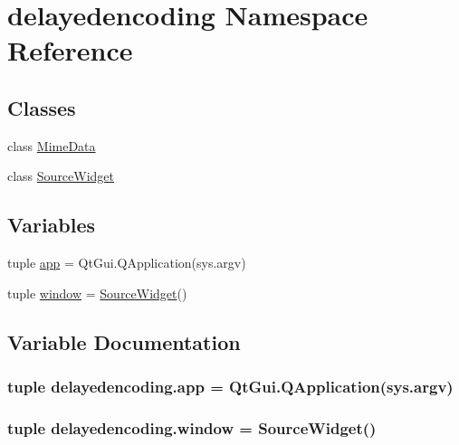 \hypertarget{namespacedelayedencoding}{}\section{delayedencoding Namespace Reference}
\label{namespacedelayedencoding}
\subsection*{Classes}
\begin{DoxyCompactItemize}
\item 
class \hyperlink{classdelayedencoding_1_1MimeData}{Mime\+Data}
\item 
class \hyperlink{classdelayedencoding_1_1SourceWidget}{Source\+Widget}
\end{DoxyCompactItemize}
\subsection*{Variables}
\begin{DoxyCompactItemize}
\item 
tuple \hyperlink{namespacedelayedencoding_ace236cbe42e6389bd79b8275e53135f0}{app} = Qt\+Gui.\+Q\+Application(sys.\+argv)
\item 
tuple \hyperlink{namespacedelayedencoding_a46933e3b00b3472468fee19792fbb452}{window} = \hyperlink{classdelayedencoding_1_1SourceWidget}{Source\+Widget}()
\end{DoxyCompactItemize}


\subsection{Variable Documentation}
\hypertarget{namespacedelayedencoding_ace236cbe42e6389bd79b8275e53135f0}{}
\subsubsection[{app}]{\setlength{\rightskip}{0pt plus 5cm}tuple delayedencoding.\+app = Qt\+Gui.\+Q\+Application(sys.\+argv)}\label{namespacedelayedencoding_ace236cbe42e6389bd79b8275e53135f0}
\hypertarget{namespacedelayedencoding_a46933e3b00b3472468fee19792fbb452}{}
\subsubsection[{window}]{\setlength{\rightskip}{0pt plus 5cm}tuple delayedencoding.\+window = {\bf Source\+Widget}()}\label{namespacedelayedencoding_a46933e3b00b3472468fee19792fbb452}
